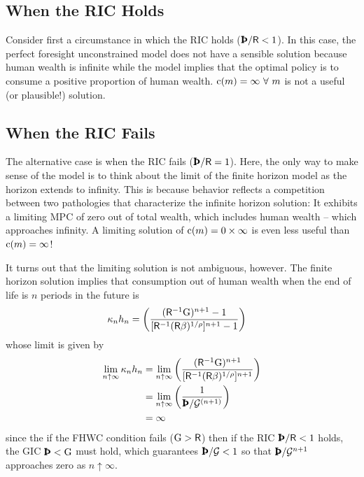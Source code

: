 \documentclass{scrartcl}
\begin{document}
\subsection{When the RIC Holds}
Consider first a circumstance in which the RIC holds ($\RPFac<1$).
In this case, the perfect foresight unconstrained model does not have a sensible solution because human wealth is infinite while the model implies that the optimal policy is to consume a positive proportion of human wealth.
$\mathrm{c}(m)=\infty~\forall~m$ is not a useful (or plausible!) solution.

\subsection{When the RIC Fails}
The alternative case is when the RIC fails ($\RPFac=1$).
Here, the only way to make sense of the model is to think about the limit of the finite horizon model as the horizon extends to infinity.
This is because behavior reflects a competition between two pathologies that characterize the infinite horizon solution:  It exhibits a limiting MPC of zero out of total wealth, which includes human wealth -- which approaches infinity.
A limiting solution of $\mathrm{c}(m) = 0 \times \infty$ is even less useful than $\mathrm{c}(m) = \infty$!


It turns out that the limiting solution is not ambiguous, however.
The finite horizon solution implies that consumption out of human wealth when the end of life is $n$ periods in the future is 
\begin{equation}\begin{gathered}\begin{aligned}
  \kappa_{n} h_{n} & =  \left(\frac{(\mathsf{R}^{-1}{\mathrm{G}})^{{n}+1}-1}{[\mathsf{R}^{-1}(\mathsf{R}\beta)^{1/\rho}]^{{n}+1}-1}\right) 
\end{aligned}\end{gathered}\end{equation}
whose limit is given by 
\begin{equation}\begin{gathered}\begin{aligned}
\lim_{{n} \uparrow \infty} \MPC_{n} \hNrm_{n} & =  \lim_{n \uparrow \infty} \left(\frac{(\Rfree^{-1}{\WGroFac})^{{n}+1}}{[\Rfree^{-1}(\Rfree\DiscFac)^{1/\CRRA}]^{{n}+1}}\right)
\\ & =  \lim_{n \uparrow \infty} \left(\frac{1}{\GPFac^{(n+1)}}\right)
\\ & =  \infty
\end{aligned}\end{gathered}\end{equation}
since the if the FHWC condition fails ($\mathrm{G} > \mathsf{R}$) then if the RIC $\APFac/\Rfree < 1$ holds, the GIC $\APFac < \WGroFac$ must hold, which guarantees $\GPFac < 1$ so that $\GPFac^{n+1}$ approaches zero as $n \uparrow \infty.$
\end{document}
